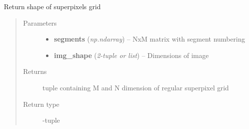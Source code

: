 \documentclass[letterpaper,10pt,english]{sphinxmanual}
\begin{document}

\begin{fulllineitems}
\label{flamingo/segmentation/index:flamingo.segmentation.superpixels.get_superpixel_grid}
Return shape of superpixels grid
\begin{quote}\begin{description}
\item[{Parameters}] \leavevmode\begin{itemize}
\item {} 
\textbf{segments} (\emph{np.ndarray}) -- NxM matrix with segment numbering

\item {} 
\textbf{img\_shape} (\emph{2-tuple or list}) -- Dimensions of image

\end{itemize}

\item[{Returns}] \leavevmode
tuple containing M and N dimension of regular superpixel grid

\item[{Return type}] -tuple

\end{description}\end{quote}

\end{fulllineitems}

\end{document}
